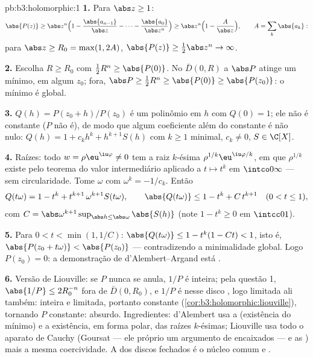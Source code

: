 \begin{solution}{pb:b3:holomorphic:1}
\textbf{1.} Para $\abs z \geq 1$:
\[
\abs{P(z)} \geq \abs z^n\Bigl(1 -
\frac{\abs{a_{n-1}}}{\abs z} - \dots -
\frac{\abs{a_0}}{\abs z^n}\Bigr)
\geq \abs z^n\Bigl(1 - \frac{A}{\abs z}\Bigr),
\qquad A = \sum_k\abs{a_k} :
\]
para $\abs z \geq R_0 = \max(1, 2A)$, $\abs{P(z)} \geq
\frac12\abs z^n \to \infty$.

\textbf{2.} Escolha $R \geq R_0$ com $\frac12R^n \geq
\abs{P(0)}$. No  $\bar D(0, R)$ a 
$\abs P$ atinge um mínimo, em algum $z_0$; fora, $\abs P
\geq \frac12R^n \geq \abs{P(0)} \geq \abs{P(z_0)}$: o
mínimo é global.

\textbf{3.} $Q(h) = P(z_0 + h)/P(z_0)$ é um polinômio em $h$
com $Q(0) = 1$; ele não é constante ($P$ não é), de modo que algum
coeficiente além do constante é não nulo: $Q(h) = 1 +
c_kh^k + h^{k+1}S(h)$ com $k \geq 1$ minimal, $c_k \neq 0$,
$S \in \C[X]$.

\textbf{4.} Raízes: todo $w = \rho\eu^{\iu\varphi} \neq 0$ tem
a raiz $k$-ésima $\rho^{1/k}\eu^{\iu\varphi/k}$, em que
$\rho^{1/k}$ existe pelo teorema do valor intermediário aplicado
a $t \mapsto t^k$ em $\intco0\infty$ --- sem circularidade.
Tome $\omega$ com $\omega^k = -1/c_k$. Então
\[
Q(t\omega) = 1 - t^k + t^{k+1}\,\omega^{k+1}S(t\omega),
\qquad
\abs{Q(t\omega)} \leq 1 - t^k + C\,t^{k+1}
\quad (0 < t \leq 1),
\]
com $C = \abs\omega^{k+1}\sup_{\abs h \leq
\abs\omega}\abs{S(h)}$ (note $1 - t^k \geq 0$ em $\intcc01$).

\textbf{5.} Para $0 < t < \min(1, 1/C)$: $\abs{Q(t\omega)}
\leq 1 - t^k(1 - Ct) < 1$, isto é, $\abs{P(z_0 + t\omega)} <
\abs{P(z_0)}$ --- contradizendo a minimalidade global. Logo
$P(z_0) = 0$: a demonstração de d'Alembert--Argand está .

\textbf{6.} Versão de Liouville: se $P$ nunca se anula, $1/P$
é inteira; pela questão 1, $\abs{1/P} \leq 2R_0^{-n}$ fora de
$\bar D(0, R_0)$, e $1/P$ é  nesse disco
, logo limitada ali também: inteira e limitada, portanto constante
(\cref{cor:b3:holomorphic:liouville}), tornando $P$ constante:
absurdo. Ingredientes: d'Alembert usa a  (existência
do mínimo) e a existência, em forma polar, das raízes $k$-ésimas;
Liouville usa todo o aparato de Cauchy (Goursat ---
ele próprio um argumento de  encaixados --- e as ) mais a mesma coercividade. A  dos discos
fechados é o núcleo comum e .


\end{solution}
